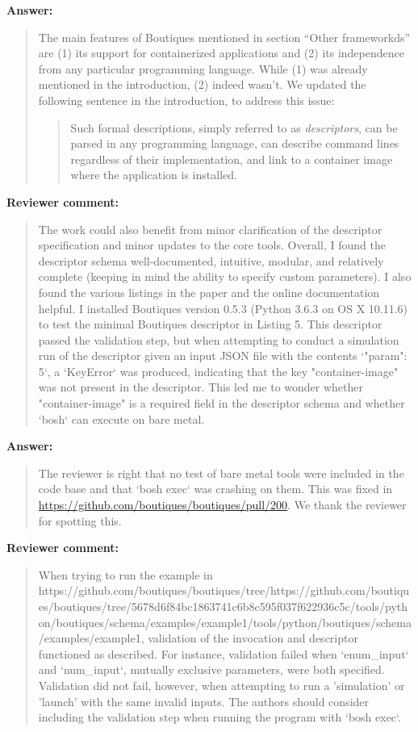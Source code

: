\documentclass[a4]{article}
\newenvironment{review}%
{\textbf{Reviewer comment:}\begin{quote}}%
{\end{quote}}%
\newenvironment{answer}%
{\textbf{Answer:}\begin{small}\begin{quote}}%
{\end{quote}\end{small}}%
\begin{document}
\begin{answer}
The main features of Boutiques mentioned in section ``Other
frameworkds'' are (1) its support for containerized applications and
(2) its independence from any particular programming language. While
(1) was already mentioned in the introduction, (2) indeed wasn't. We
updated the following sentence in the introduction, to address this
issue:

\begin{quote}
  Such formal descriptions, simply referred
to as \emph{descriptors}, \color{blue}can be parsed in any programming language,
can describe command lines regardless of their implementation,\color{black}
and link to a container image where the application is
installed.
\end{quote}

\end{answer}

\begin{review}
The work could also benefit from minor clarification of the descriptor
specification and minor updates to the core tools. Overall, I found
the descriptor schema well-documented, intuitive, modular, and
relatively complete (keeping in mind the ability to specify custom
parameters). I also found the various listings in the paper and the
online documentation helpful. I installed Boutiques version 0.5.3
(Python 3.6.3 on OS X 10.11.6) to test the minimal Boutiques
descriptor in Listing 5. This descriptor passed the validation step,
but when attempting to conduct a simulation run of the descriptor
given an input JSON file with the contents `{"param": 5}`, a
`KeyError` was produced, indicating that the key "container-image" was
not present in the descriptor. This led me to wonder whether
"container-image" is a required field in the descriptor schema and
whether `bosh` can execute on bare metal.
\end{review}

\begin{answer}
  The reviewer is right that no test of bare metal tools were included
  in the code base and that `bosh exec` was crashing on them. This was
  fixed in \url{https://github.com/boutiques/boutiques/pull/200}. We
  thank the reviewer for spotting this.
\end{answer}


\begin{review}
When trying to run the example in
https://github.com/boutiques/boutiques/tree/https://github.com/boutiques/boutiques/tree/5678d6f84bc1863741c6b8c595f037f622936c5c/tools/python/boutiques/schema/examples/example1/tools/python/boutiques/schema/examples/example1,
validation of the invocation and descriptor functioned as
described. For instance, validation failed when `enum\_input` and
`num\_input`, mutually exclusive parameters, were both
specified. Validation did not fail, however, when attempting to run a
'simulation' or 'launch' with the same invalid inputs. The authors
should consider including the validation step when running the program
with `bosh exec`.
\end{review}
\end{document}
